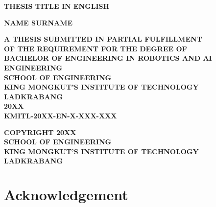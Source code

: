 \documentclass[12pt,a4paper]{report}
\begin{document}
\begin{titlepage}
    \fontsize{18pt}{18pt}\bfseries THESIS TITLE IN ENGLISH \\[1.5em]
    \centering
    \vfill
    \begin{center}
        {\fontsize{16pt}{16pt}\bfseries NAME SURNAME\par}
    \end{center}
    \vfill
    \vfill
    {\fontsize{16pt}{16pt}\bfseries
    A THESIS SUBMITTED IN PARTIAL FULFILLMENT \\ OF THE REQUIREMENT FOR THE DEGREE OF \\ BACHELOR OF ENGINEERING IN ROBOTICS AND AI ENGINEERING \\ SCHOOL OF ENGINEERING \\ KING MONGKUT'S INSTITUTE OF TECHNOLOGY LADKRABANG \\ 20XX \\ KMITL-20XX-EN-X-XXX-XXX}
\end{titlepage}

\newpage
\thispagestyle{empty}
\vspace*{\fill}
    {\fontsize{16pt}{16pt}\bfseries
    \noindent
    COPYRIGHT 20XX \\
    SCHOOL OF ENGINEERING \\
    KING MONGKUT'S INSTITUTE OF TECHNOLOGY LADKRABANG}

\newpage
{}


\chapter*{Acknowledgement}

\cleardoublepage

\tableofcontents
\cleardoublepage
\listoftables
\cleardoublepage
\listoffigures

\cleardoublepage
{}







\cite{zhang2023design}

\cleardoublepage
{}



\appendix

\end{document}
